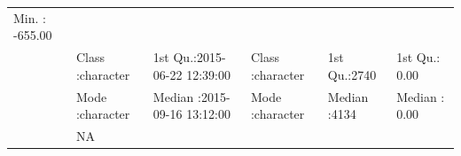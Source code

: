 \documentclass[]{article}
\begin{document}
\begin{longtable}[]{@{}llllll@{}}
\begin{minipage}[t]{0.15\columnwidth}
Min. : -655.00\strut
\end{minipage}\tabularnewline
\begin{minipage}[t]{0.03\columnwidth}\raggedright\strut
\strut
\end{minipage} & \begin{minipage}[t]{0.15\columnwidth}\raggedright\strut
Class :character\strut
\end{minipage} & \begin{minipage}[t]{0.24\columnwidth}\raggedright\strut
1st Qu.:2015-06-22 12:39:00\strut
\end{minipage} & \begin{minipage}[t]{0.15\columnwidth}\raggedright\strut
Class :character\strut
\end{minipage} & \begin{minipage}[t]{0.12\columnwidth}\raggedright\strut
1st Qu.:2740\strut
\end{minipage} & \begin{minipage}[t]{0.15\columnwidth}\raggedright\strut
1st Qu.: 0.00\strut
\end{minipage}\tabularnewline
\begin{minipage}[t]{0.03\columnwidth}\raggedright\strut
\strut
\end{minipage} & \begin{minipage}[t]{0.15\columnwidth}\raggedright\strut
Mode :character\strut
\end{minipage} & \begin{minipage}[t]{0.24\columnwidth}\raggedright\strut
Median :2015-09-16 13:12:00\strut
\end{minipage} & \begin{minipage}[t]{0.15\columnwidth}\raggedright\strut
Mode :character\strut
\end{minipage} & \begin{minipage}[t]{0.12\columnwidth}\raggedright\strut
Median :4134\strut
\end{minipage} & \begin{minipage}[t]{0.15\columnwidth}\raggedright\strut
Median : 0.00\strut
\end{minipage}\tabularnewline
\begin{minipage}[t]{0.03\columnwidth}\raggedright\strut
\strut
\end{minipage} & \begin{minipage}[t]{0.15\columnwidth}\raggedright\strut
NA\strut
\end{minipage} & \begin{minipage}[t]{0.24\columnwidth}\raggedright\strut

\end{minipage}
\end{longtable}
\end{document}
